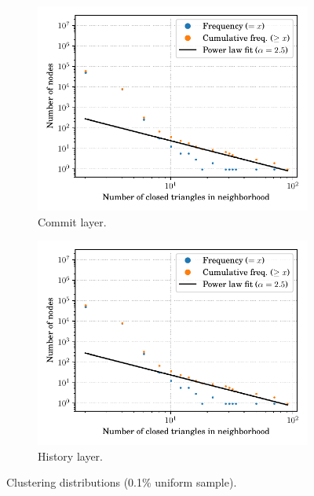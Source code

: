 \begin{figure}
    \begin{subfigure}{.49\textwidth}
        \centering
        \includegraphics[width=\linewidth]{img/topology/clusteringcoeff/rev}
        \caption{Commit layer.}
        \label{fig:clustering_rev}
    \end{subfigure}\hfill
    \begin{subfigure}{.49\textwidth}
        \centering
        \includegraphics[width=\linewidth]{img/topology/clusteringcoeff/rel+rev}
        \caption{History layer.}
        \label{fig:clustering_rel+rev}
    \end{subfigure}

    \caption{Clustering distributions (0.1\% uniform sample).}
    \label{fig:clustering}
\end{figure}%

